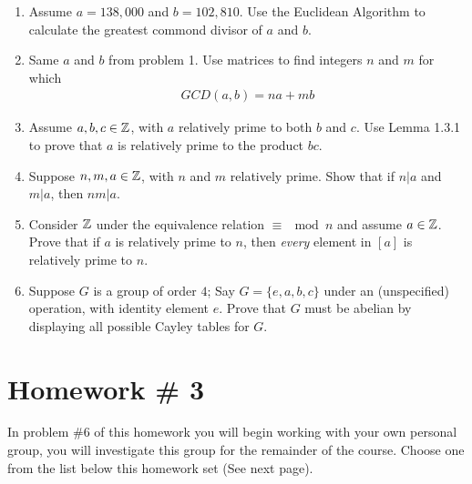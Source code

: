 \begin{enumerate}
    \item Assume $a=138,000$ and $b=102,810$. Use the Euclidean Algorithm to calculate the greatest commond divisor of $a$ and $b$. \\ \steezybreak
    
    \item Same $a$ and $b$ from problem 1. Use matrices to find integers $n$ and $m$ for which
    \begin{align}
        GCD(a,b)=na+mb \nonumber
    \end{align}
    \item Assume $a,b,c\in {\mathbb{Z}}$, with $a$ relatively prime to both $b$ and $c$. Use Lemma 1.3.1 to prove that $a$ is relatively prime to the product $bc$. \\ \steezybreak

    \item Suppose $n,m,a \in {\mathbb{Z}}$, with $n$ and $m$ relatively prime. Show that if $n|a$ and $m|a$, then $nm|a$. \\ \steezybreak
    
    \item Consider ${\mathbb{Z}}$ under the equivalence relation $\equiv \mod n$ and assume $a\in {\mathbb{Z}}$. Prove that if $a$ is relatively prime to $n$, then \textit{every} element in $[a]$ is relatively prime to $n$. \\ \steezybreak
    
    \item Suppose $G$ is a group of order $4$; Say $G=\{e,a,b,c\}$ under an (unspecified) operation, with identity element $e$. Prove that $G$ must be abelian by displaying all possible Cayley tables for $G$.
\end{enumerate}
\newpage

\section{Homework \# 3}
\label{sec:HW3}

In problem \#6 of this homework you will begin working with your own personal group, you will investigate this group for the remainder of the course. Choose one from the list below this homework set (See next page). \\ \steezybreak

